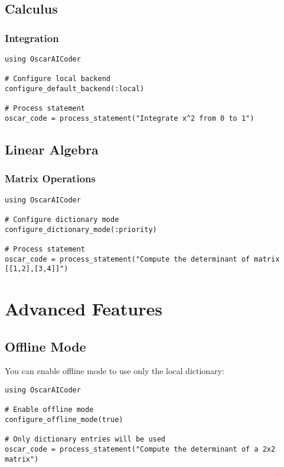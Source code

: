 \documentclass[11pt,a4paper]{article}
\begin{document}
\subsection{Calculus}

\subsubsection{Integration}

\begin{lstlisting}
using OscarAICoder

# Configure local backend
configure_default_backend(:local)

# Process statement
oscar_code = process_statement("Integrate x^2 from 0 to 1")
\end{lstlisting}

\subsection{Linear Algebra}

\subsubsection{Matrix Operations}

\begin{lstlisting}
using OscarAICoder

# Configure dictionary mode
configure_dictionary_mode(:priority)

# Process statement
oscar_code = process_statement("Compute the determinant of matrix [[1,2],[3,4]]")
\end{lstlisting}

\section{Advanced Features}

\subsection{Offline Mode}

You can enable offline mode to use only the local dictionary:

\begin{lstlisting}
using OscarAICoder

# Enable offline mode
configure_offline_mode(true)

# Only dictionary entries will be used
oscar_code = process_statement("Compute the determinant of a 2x2 matrix")
\end{lstlisting}
\end{document}
